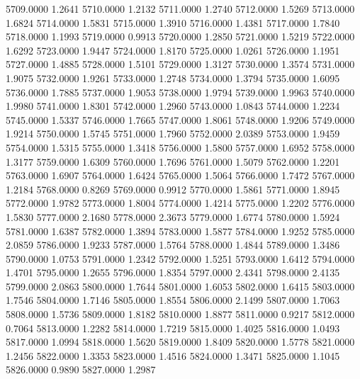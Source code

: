 5709.0000      1.2641
5710.0000      1.2132
5711.0000      1.2740
5712.0000      1.5269
5713.0000      1.6824
5714.0000      1.5831
5715.0000      1.3910
5716.0000      1.4381
5717.0000      1.7840
5718.0000      1.1993
5719.0000      0.9913
5720.0000      1.2850
5721.0000      1.5219
5722.0000      1.6292
5723.0000      1.9447
5724.0000      1.8170
5725.0000      1.0261
5726.0000      1.1951
5727.0000      1.4885
5728.0000      1.5101
5729.0000      1.3127
5730.0000      1.3574
5731.0000      1.9075
5732.0000      1.9261
5733.0000      1.2748
5734.0000      1.3794
5735.0000      1.6095
5736.0000      1.7885
5737.0000      1.9053
5738.0000      1.9794
5739.0000      1.9963
5740.0000      1.9980
5741.0000      1.8301
5742.0000      1.2960
5743.0000      1.0843
5744.0000      1.2234
5745.0000      1.5337
5746.0000      1.7665
5747.0000      1.8061
5748.0000      1.9206
5749.0000      1.9214
5750.0000      1.5745
5751.0000      1.7960
5752.0000      2.0389
5753.0000      1.9459
5754.0000      1.5315
5755.0000      1.3418
5756.0000      1.5800
5757.0000      1.6952
5758.0000      1.3177
5759.0000      1.6309
5760.0000      1.7696
5761.0000      1.5079
5762.0000      1.2201
5763.0000      1.6907
5764.0000      1.6424
5765.0000      1.5064
5766.0000      1.7472
5767.0000      1.2184
5768.0000      0.8269
5769.0000      0.9912
5770.0000      1.5861
5771.0000      1.8945
5772.0000      1.9782
5773.0000      1.8004
5774.0000      1.4214
5775.0000      1.2202
5776.0000      1.5830
5777.0000      2.1680
5778.0000      2.3673
5779.0000      1.6774
5780.0000      1.5924
5781.0000      1.6387
5782.0000      1.3894
5783.0000      1.5877
5784.0000      1.9252
5785.0000      2.0859
5786.0000      1.9233
5787.0000      1.5764
5788.0000      1.4844
5789.0000      1.3486
5790.0000      1.0753
5791.0000      1.2342
5792.0000      1.5251
5793.0000      1.6412
5794.0000      1.4701
5795.0000      1.2655
5796.0000      1.8354
5797.0000      2.4341
5798.0000      2.4135
5799.0000      2.0863
5800.0000      1.7644
5801.0000      1.6053
5802.0000      1.6415
5803.0000      1.7546
5804.0000      1.7146
5805.0000      1.8554
5806.0000      2.1499
5807.0000      1.7063
5808.0000      1.5736
5809.0000      1.8182
5810.0000      1.8877
5811.0000      0.9217
5812.0000      0.7064
5813.0000      1.2282
5814.0000      1.7219
5815.0000      1.4025
5816.0000      1.0493
5817.0000      1.0994
5818.0000      1.5620
5819.0000      1.8409
5820.0000      1.5778
5821.0000      1.2456
5822.0000      1.3353
5823.0000      1.4516
5824.0000      1.3471
5825.0000      1.1045
5826.0000      0.9890
5827.0000      1.2987
